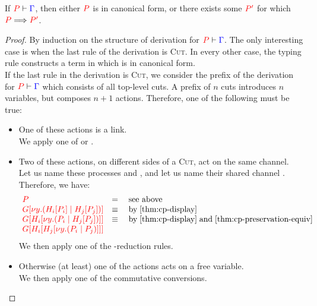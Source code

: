 \begin{theorem}[Progress]\label{thm:cp-progress}
  If $\seq[{ P }]{ \Gamma }$,
  then either $\tm{P}$ is in canonical form,
  or there exists some $\tm{P'}$ for which $\reducesto{P}{P'}$.
\end{theorem}
\begin{proof}
  By induction on the structure of derivation for $\seq[{ P }]{ \Gamma }$.
  The only interesting case is when the last rule of the derivation is
  \textsc{Cut}. In every other case, the typing rule constructs a term in which
  is in canonical form. 
  \\
  If the last rule in the derivation is \textsc{Cut}, we consider the prefix of
  the derivation for $\seq[{ P }]{ \Gamma}$ which consists of all top-level
  cuts. A prefix of $n$ cuts introduces $n$ variables, but composes $n+1$
  actions. Therefore, one of the following must be true: 
  \begin{itemize}
  \item
    One of these actions is a link.
    \\
    We apply one of  or .
  \item
    Two of these actions, on different sides of a \textsc{Cut}, act on the same channel.
    \\
    Let us name these processes  and , and let us name their
    shared channel . Therefore, we have:
    \[\!
      \begin{array}{ll}
        \tm{P} & = \quad \text{see above}\\
        \tm{\cpPlug{G}{\cpCut{y}{\cpPlug{H_i}{P_i}}{\cpPlug{H_j}{P_j}}}} &
        \equiv \quad \text{by} \; \cref{thm:cp-display}\\
        \tm{\cpPlug{G}{\cpPlug{H_i}{\cpCut{y}{P_i}{\cpPlug{H_j}{P_j}}}}} &
        \equiv \quad \text{by} \; \cref{thm:cp-display} \; \text{and} \; \cref{thm:cp-preservation-equiv}\\
        \tm{\cpPlug{G}{\cpPlug{H_i}{\cpPlug{H_j}{\cpCut{y}{P_i}{P_j}}}}} & 
      \end{array}
    \]
    We then apply one of the \textbeta-reduction rules.
  \item
    Otherwise (at least) one of the actions acts on a free variable.
    \\
    We then apply one of the commutative conversions.
  \end{itemize}
\end{proof}
